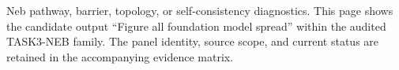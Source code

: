 Neb pathway, barrier, topology, or self-consistency diagnostics. This page shows the candidate output ``Figure all foundation model spread'' within the audited TASK3-NEB family. The panel identity, source scope, and current status are retained in the accompanying evidence matrix.
